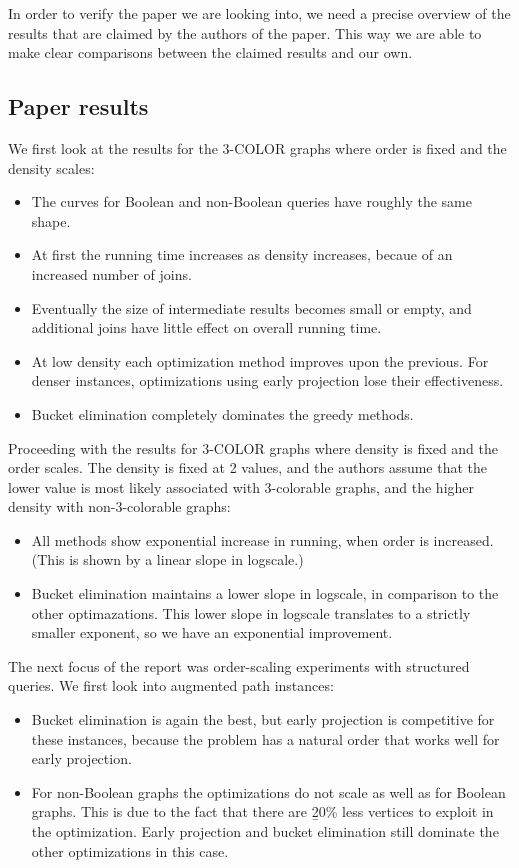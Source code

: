 In order to verify the paper we are looking into, we need a precise overview of the results that are claimed by the authors of the paper. This way we are able to make clear comparisons between the claimed results and our own.

\subsection{Paper results}
We first look at the results for the 3-COLOR graphs where order is fixed and the density scales:
\begin{itemize}
	\item The curves for Boolean and non-Boolean queries have roughly the same shape.
	\item At first the running time increases as density increases, becaue of an increased number of joins.
	\item Eventually the size of intermediate results becomes small or empty, and additional joins have little effect on overall running time.
	\item At low density each optimization method improves upon the previous. For denser instances, optimizations using early projection lose their effectiveness.
	\item Bucket elimination completely dominates the greedy methods.
\end{itemize}

\noindent Proceeding with the results for 3-COLOR graphs where density is fixed and the order scales. The density is fixed at 2 values, and the authors assume that the lower value is most likely associated with 3-colorable graphs, and the higher density with non-3-colorable graphs:
\begin{itemize}
	\item All methods show exponential increase in running, when order is increased. (This is shown by a linear slope in logscale.)
	\item Bucket elimination maintains a lower slope in logscale, in comparison to the other optimazations. This lower slope in logscale translates to a strictly smaller exponent, so we have an exponential improvement.
\end{itemize}

\noindent The next focus of the report was order-scaling experiments with structured queries. We first look into augmented path instances:
\begin{itemize}
	\item Bucket elimination is again the best, but early projection is competitive for these instances, because the problem has a natural order that works well for early projection.
	\item For non-Boolean graphs the optimizations do not scale as well as for Boolean graphs. This is due to the fact that there are {\b 20\% less vertices to exploit in the optimization}. Early projection and bucket elimination still dominate the other optimizations in this case.
\end{itemize}


